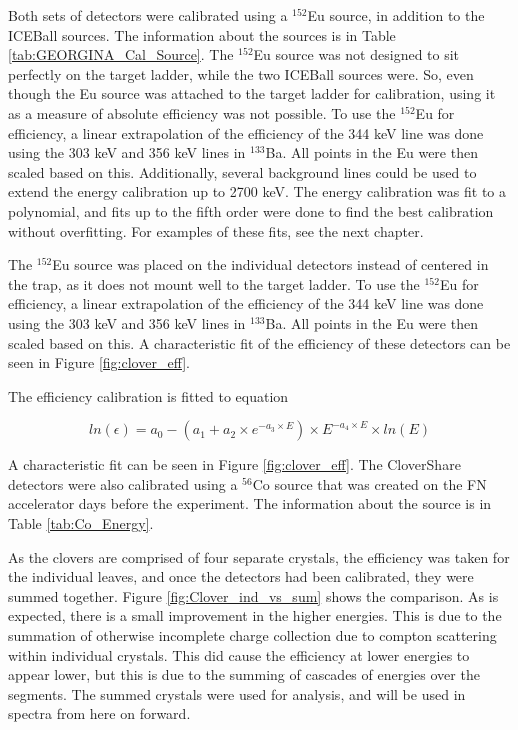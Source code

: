 Both sets of detectors were calibrated using a $^{152}$Eu source, in addition to the ICEBall sources. The information about the sources is in Table \ref{tab:GEORGINA_Cal_Source}. The $^{152}$Eu source was not designed to sit perfectly on the target ladder, while the two ICEBall sources were. So, even though the Eu source was attached to the target ladder for calibration, using it as a measure of absolute efficiency was not possible. To use the $^{152}$Eu for efficiency, a linear extrapolation of the efficiency of the 344 keV line was done using the 303 keV and 356 keV lines in $^{133}$Ba. All points in the Eu were then scaled based on this. Additionally, several background lines could be used to extend the energy calibration up to 2700 keV. The energy calibration was fit to a polynomial, and fits up to the fifth order were done to find the best calibration without overfitting. For examples of these fits, see the next chapter.



The $^{152}$Eu source was placed on the individual detectors instead of centered in the trap, as it does not mount well to the target ladder. To use the $^{152}$Eu for efficiency, a linear extrapolation of the efficiency of the 344 keV line was done using the 303 keV and 356 keV lines in $^{133}$Ba. All points in the Eu were then scaled based on this. A characteristic fit of the efficiency of these detectors can be seen in Figure \ref{fig:clover_eff}.

The efficiency calibration is fitted to equation

\begin{equation}
    ln(\epsilon) = a_0-(a_1+a_2\times e^{-a_3\times E})\times E^{-a_4\times E}\times ln(E)
    \label{eq:Ge_Eff}
\end{equation}

A characteristic fit can be seen in Figure \ref{fig:clover_eff}. The CloverShare detectors were also calibrated using a $^{56}$Co source that was created on the FN accelerator days before the experiment. The information about the source is in Table \ref{tab:Co_Energy}. 





As the clovers are comprised of four separate crystals, the efficiency was taken for the individual leaves, and once the detectors had been calibrated, they were summed together. Figure \ref{fig:Clover_ind_vs_sum} shows the comparison. As is expected, there is a small improvement in the higher energies. This is due to the summation of otherwise incomplete charge collection due to compton scattering within individual crystals. This did cause the efficiency at lower energies to appear lower, but this is due to the summing of cascades of energies over the segments. The summed crystals were used for analysis, and will be used in spectra from here on forward.

